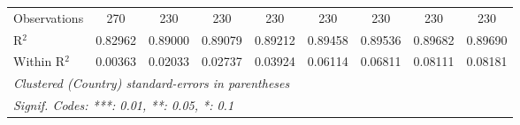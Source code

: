 \begin{table}[htbp]
\begin{tabular}{lcccccccc}
      Observations                            & 270      & 230           & 230                   & 230      & 230      & 230          & 230          & 230\\  
      R$^2$                                   & 0.82962  & 0.89000       & 0.89079               & 0.89212  & 0.89458  & 0.89536      & 0.89682      & 0.89690\\  
      Within R$^2$                            & 0.00363  & 0.02033       & 0.02737               & 0.03924  & 0.06114  & 0.06811      & 0.08111      & 0.08181\\  
      \midrule \midrule
      \multicolumn{9}{l}{\emph{Clustered (Country) standard-errors in parentheses}}\\
      \multicolumn{9}{l}{\emph{Signif. Codes: ***: 0.01, **: 0.05, *: 0.1}}\\
   \end{tabular}
\end{table}


